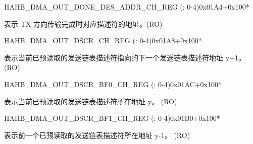 \begin{register}{H}{AHB\_DMA\_OUT\_DONE\_DES\_ADDR\_CH\_REG (: 0-4)}{0x01A4+0x100*}\label{regdesc:AHBDMAOUTDONEDESADDRCHNREG}
%
\regnewline%
\begin{regdesc}\begin{reglist}
\label{fielddesc:AHBDMAOUTDONEDESADDRCHN}\item [AHB\_DMA\_OUT\_DONE\_DES\_ADDR\_CH\regindex{n}] 表示 TX 方向传输完成时对应描述符的地址。(RO)
\end{reglist}\end{regdesc}
\end{register}


\begin{register}{H}{AHB\_DMA\_OUT\_DSCR\_CH\_REG (: 0-4)}{0x01A8+0x100*}\label{regdesc:AHBDMAOUTDSCRCHNREG}
%
\regnewline%
\begin{regdesc}\begin{reglist}
\label{fielddesc:AHBDMAOUTLINKDSCRCHN}\item [AHB\_DMA\_OUTLINK\_DSCR\_CH\regindex{n}] 表示当前已预读取的发送链表描述符指向的下一个发送链表描述符地址 y+1。 (RO)
\end{reglist}\end{regdesc}
\end{register}


\begin{register}{H}{AHB\_DMA\_OUT\_DSCR\_BF0\_CH\_REG (: 0-4)}{0x01AC+0x100*}\label{regdesc:AHBDMAOUTDSCRBF0CHNREG}
%
\regnewline%
\begin{regdesc}\begin{reglist}
\label{fielddesc:AHBDMAOUTLINKDSCRBF0CHN}\item [AHB\_DMA\_OUTLINK\_DSCR\_BF0\_CH\regindex{n}] 表示当前已预读取的发送链表描述符所在地址 y。 (RO)
\end{reglist}\end{regdesc}
\end{register}


\begin{register}{H}{AHB\_DMA\_OUT\_DSCR\_BF1\_CH\_REG (: 0-4)}{0x01B0+0x100*}\label{regdesc:AHBDMAOUTDSCRBF1CHNREG}
%
\regnewline%
\begin{regdesc}\begin{reglist}
\label{fielddesc:AHBDMAOUTLINKDSCRBF1CHN}\item [AHB\_DMA\_OUTLINK\_DSCR\_BF1\_CH\regindex{n}] 表示前一个已预读取的发送链表描述符所在地址 y-1。 (RO)
\end{reglist}\end{regdesc}
\end{register}



